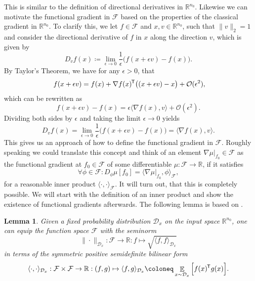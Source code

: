 \documentclass[11pt, a4paper]{article}
\newtheorem{lemma}[theorem]{Lemma}
\newcommand{\R}{\mathbb{R}}
\newcommand{\D}{\mathcal{D}}
\newcommand{\F}{\mathcal{F}}
\renewcommand{\O}{\mathcal{O}}
\newcommand*{\tr}{^{\mkern-1.5mu\mathsf{T}}}
\DeclareMathOperator*{\E}{\mathbb{E}}
\begin{document}
This is similar to the definition of directional derivatives in $\R^{n_0}$. Likewise we can motivate the functional gradient in $\F$ based on the properties of the classical gradient in $\R^{n_0}$. To clarify this, we let $f \in \F$ and $x,v \in \R^{n_0}$, such that $\| v \|_2 = 1$ and consider the directional derivative of $f$ in $x$ along the direction $v$, which is given by
\[ D_vf(x) \coloneq \lim_{\epsilon \to 0} \frac{1}{\epsilon} \Big ( f(x + \epsilon v) - f(x) \Big ). \]
By Taylor's Theorem, we have for any $\epsilon > 0$, that 
\[ f(x+\epsilon v) = f(x) + \nabla f(x) \tr \big ((x + \epsilon v) - x \big ) + \O(\epsilon^2), \]
which can be rewritten as
\[ f(x + \epsilon v ) - f(x) = \epsilon \big \langle \nabla f(x), v \big \rangle + \O (\epsilon^2). \]
Dividing both sides by $\epsilon$ and taking the limit $\epsilon \to 0$ yields
\[ D_vf(x) =  \lim_{\epsilon \to 0} \frac{1}{\epsilon} \Big ( f(x + \epsilon v) - f(x) \Big ) = \big \langle \nabla f(x), v \big \rangle. \]
This gives us an approach of how to define the functional gradient in $\F$. Roughly speaking we could translate this concept and think of an element $\nabla \mu |_{f_0} \in \F $ as the functional gradient at $f_0 \in \F$ of some differentiable $\mu: \F \to \R$, if it satisfies
\[ \forall \phi \in \F : D_\phi\mu[f_0] = \big \langle \nabla \mu |_{f_0}, \phi \big \rangle_\F, \]
for a reasonable inner product $\langle \cdot, \cdot \rangle_\F$. It will turn out, that this is completely possible. We will start with the definition of an inner product and show the existence of functional gradients afterwards. The following lemma is based on \cite{NTK}.

\begin{lemma}
Given a fixed probability distribution $\D_x$ on the input space $\R^{n_0}$, one can equip the function space $\F$ with the seminorm
\[ \| \cdot \|_{\D_x} : \F \to \R : f \mapsto \sqrt{\langle f , f \rangle_{\D_x}} \] 
in terms of the symmetric positive semidefinite bilinear form
\[ \langle \cdot,\cdot \rangle_{\D_x} : \F \times \F \to \R : (f,g) \mapsto \langle f,g \rangle_{\D_x} \coloneq \E_{x \sim \D_x} \Big [ f(x)\tr g(x) \Big ].\]
\end{lemma}
\end{document}
